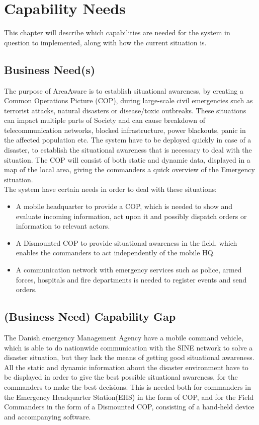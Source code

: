 \chapter{Capability Needs}
\label{chp_need}

This chapter will describe which capabilities are needed for the system in question to implemented, along with how the current situation is.

\section{Business Need(s)}
The purpose of AreaAware is to establish situational awareness, by creating a Common Operations Picture (COP), during large-scale civil emergencies such as terrorist attacks, natural disasters or disease/toxic outbreaks. These situations can impact multiple parts of Society and can cause breakdown of telecommunication networks, blocked infrastructure, power blackouts, panic in the affected population etc. The system have to be deployed quickly in case of a disaster, to establish the situational awareness that is necessary to deal with the situation. The COP will consist of both static and dynamic data, displayed in a map of the local area, giving the commanders a quick overview of the Emergency situation. \\

\noindent The system have certain needs in order to deal with these situations:
\begin{itemize}
	\itemsep0em
	\item A mobile headquarter to provide a COP, which is needed to show and evaluate incoming information, act upon it and possibly dispatch orders or information to relevant actors.
	\item A Dismounted COP to provide situational awareness in the field, which enables the commanders to act independently of the mobile HQ.
	\item A communication network with emergency services such as police, armed forces, hospitals and fire departments is needed to register events and send orders.
\end{itemize}

\section{(Business Need) Capability Gap}
The Danish emergency Management Agency have a mobile command vehicle, which is able to do nationwide communication with the SINE network to solve a disaster situation, but they lack the means of getting good situational awareness. All the static and dynamic information about the disaster environment have to be displayed in order to give the best possible situational awareness, for the commanders to make the best decisions. This is needed both for commanders in the Emergency Headquarter Station(EHS) in the form of COP, and for the Field Commanders in the form of a Dismounted COP, consisting of a hand-held device and accompanying software.

